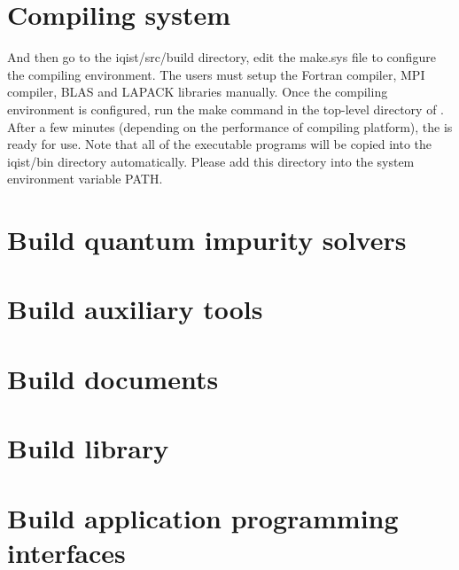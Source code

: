 \section{Compiling system}

And then go to the iqist/src/build directory, edit the make.sys file to configure the compiling environment. The users must setup the Fortran compiler, MPI compiler, BLAS and LAPACK libraries manually. Once the compiling environment is configured, run the make command in the top-level directory of {\iqist}. After a few minutes (depending on the performance of compiling platform), the {\iqist} is ready for use. Note that all of the executable programs will be copied into the iqist/bin directory automatically. Please add this directory into the system environment variable PATH.

\section{Build quantum impurity solvers}
\section{Build auxiliary tools}
\section{Build documents}
\section{Build library}
\section{Build application programming interfaces}
